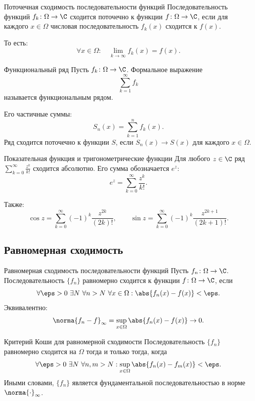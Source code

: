 \begin{Definition}{Поточечная сходимость последовательности функций}{}
	Последовательность функций $f_k\colon\Omega\to\C$ сходится поточечно к функции $f\colon\Omega\to\C$, если для каждого $x\in\Omega$ числовая последовательность $f_k(x)$ сходится к $f(x)$.
	
	То есть:
	\[
	\forall x\in\Omega:
	\quad
	\lim_{k\to\infty}f_k(x)=f(x).
	\]
\end{Definition}

\begin{Definition}{Функциональный ряд}{}
	Пусть $f_k\colon\Omega\to\C$. Формальное выражение
	\[
	\sum_{k=1}^{\infty}f_k
	\]
	называется функциональным рядом.
	
	Его частичные суммы:
	\[
	S_n(x)=\sum_{k=1}^{n}f_k(x).
	\]
	Ряд сходится поточечно к функции $S$, если $S_n(x)\to S(x)$ для каждого $x\in\Omega$.
\end{Definition}

\begin{Example}{Показательная функция и тригонометрические функции}{}
	Для любого $z\in\C$ ряд $\sum_{k=0}^{\infty}\frac{z^k}{k!}$ сходится абсолютно. Его сумма обозначается $e^z$:
	\[
	e^z=\sum_{k=0}^{\infty}\frac{z^k}{k!}.
	\]
	
	Также:
	\[
	\cos z=\sum_{k=0}^{\infty}(-1)^k\frac{z^{2k}}{(2k)!},
	\qquad
	\sin z=\sum_{k=0}^{\infty}(-1)^k\frac{z^{2k+1}}{(2k+1)!}.
	\]
\end{Example}

\subsection{Равномерная сходимость}

\begin{Definition}{Равномерная сходимость последовательности функций}{}
	Пусть $f_n\colon\Omega\to\C$. Последовательность $\{f_n\}$ равномерно сходится к функции $f\colon\Omega\to\C$, если
	\[
	\forall\eps>0\ \exists N\ \forall n>N\ \forall x\in\Omega:
	\abs{f_n(x)-f(x)}<\eps.
	\]
	Эквивалентно:
	\[
	\norma{f_n-f}_{\infty}
	=
	\sup_{x\in\Omega}\abs{f_n(x)-f(x)}
	\to0.
	\]
\end{Definition}

\begin{Statement}{Критерий Коши для равномерной сходимости}{}
	Последовательность $\{f_n\}$ равномерно сходится на $\Omega$ тогда и только тогда, когда
	\[
	\forall\eps>0\ \exists N\ \forall n,m>N:
	\sup_{x\in\Omega}\abs{f_n(x)-f_m(x)}<\eps.
	\]
	Иными словами, $\{f_n\}$ является фундаментальной последовательностью в норме $\norma{\cdot}_{\infty}$.
\end{Statement}

